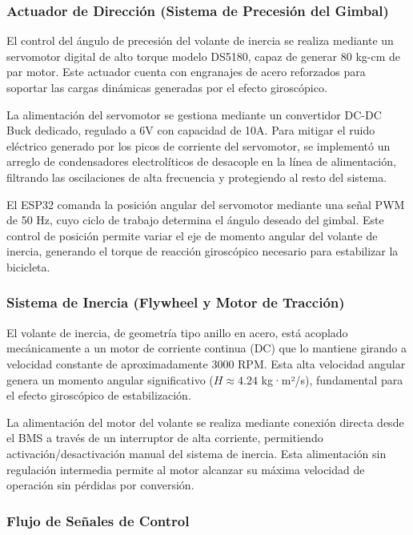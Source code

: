 \documentclass[12pt,letterpaper]{report}
\begin{document}
\subsubsection*{Actuador de Dirección (Sistema de Precesión del Gimbal)}

El control del ángulo de precesión del volante de inercia se realiza mediante un servomotor digital de alto torque modelo DS5180, capaz de generar 80 kg-cm de par motor. Este actuador cuenta con engranajes de acero reforzados para soportar las cargas dinámicas generadas por el efecto giroscópico. 

La alimentación del servomotor se gestiona mediante un convertidor DC-DC Buck dedicado, regulado a 6V con capacidad de 10A. Para mitigar el ruido eléctrico generado por los picos de corriente del servomotor, se implementó un arreglo de condensadores electrolíticos de desacople en la línea de alimentación, filtrando las oscilaciones de alta frecuencia y protegiendo al resto del sistema.

El ESP32 comanda la posición angular del servomotor mediante una señal PWM de 50 Hz, cuyo ciclo de trabajo determina el ángulo deseado del gimbal. Este control de posición permite variar el eje de momento angular del volante de inercia, generando el torque de reacción giroscópico necesario para estabilizar la bicicleta.

\subsubsection*{Sistema de Inercia (Flywheel y Motor de Tracción)}

El volante de inercia, de geometría tipo anillo en acero, está acoplado mecánicamente a un motor de corriente continua (DC) que lo mantiene girando a velocidad constante de aproximadamente 3000 RPM. Esta alta velocidad angular genera un momento angular significativo ($H \approx 4.24$ kg·m²/s), fundamental para el efecto giroscópico de estabilización.

La alimentación del motor del volante se realiza mediante conexión directa desde el BMS a través de un interruptor de alta corriente, permitiendo activación/desactivación manual del sistema de inercia. Esta alimentación sin regulación intermedia permite al motor alcanzar su máxima velocidad de operación sin pérdidas por conversión.

\subsubsection*{Flujo de Señales de Control}
\end{document}
